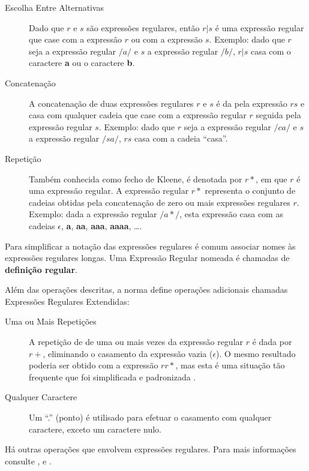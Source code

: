 \begin{description}
	\item[Escolha Entre Alternativas] Dado que $r$ e $s$ são expressões
		regulares, então $r | s$ é uma expressão regular que case com a expressão
		$r$ ou com a expressão $s$. Exemplo: dado que $r$ seja a expressão regular
		$/a/$ e $s$ a expressão regular $/b/$, $r | s$ casa com o caractere
		\textbf{a} ou o caractere \textbf{b}.
	\item[Concatenação] A concatenação de duas expressões regulares $r$ e $s$ é
		da pela expressão $rs$ e casa com qualquer cadeia que case com a expressão
		regular $r$ seguida pela expressão regular $s$. Exemplo: dado que $r$ seja
		a expressão regular $/ca/$ e $s$ a expressão regular $/sa/$, $rs$ casa
		com a cadeia ``casa''.
	\item[Repetição] Também conhecida como fecho de Kleene, é denotada por $r*$,
		em que $r$ é uma expressão regular. A expressão regular $r*$ representa o
		conjunto de cadeias obtidas pela concatenação de zero ou mais expressões
		regulares $r$. Exemplo: dada a expressão regular $/a*/$, esta expressão
		casa com as cadeias \textbf{$\epsilon$}, \textbf{a}, \textbf{aa},
		\textbf{aaa}, \textbf{aaaa}, \dots.
\end{description}

Para simplificar a notação das expressões regulares é comum associar nomes às
expressões regulares longas. Uma Expressão Regular nomeada é chamadas de
\textbf{definição regular}.

Além das operações descritas, a norma  define operações
adicionais chamadas Expressões Regulares Extendidas:

\begin{description}
	\item[Uma ou Mais Repetições] A repetição de de uma ou mais vezes da
		expressão regular $r$ é dada por $r+$, eliminando o casamento da expressão
		vazia (\(\epsilon\)). O mesmo resultado poderia ser obtido com a expressão
		$rr*$, mas esta é uma situação tão frequente que foi simplificada e
		padronizada \cite{louden97-pt}.
	\item[Qualquer Caractere] Um ``.'' (ponto) é utilisado para efetuar o
		casamento com qualquer caractere, exceto um caractere nulo.
\end{description}

Há outras operações que envolvem expressões regulares. Para mais informações
consulte ,  e
.

